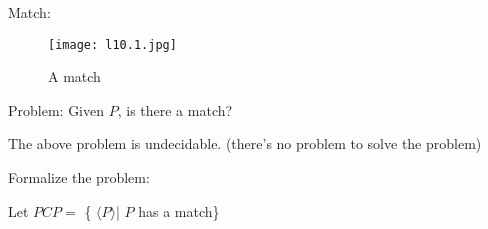 \begin{problem}
\begin{example}
        Match:
        \begin{figure}[H]
            \centering
            \texttt{[image: l10.1.jpg]}
            \caption{A match}
        \end{figure}
    \end{example}

    Problem: Given \(P\), is there a match?
\end{problem}


\begin{theorem}
    The above problem is undecidable. (there's no problem to solve the problem)

    Formalize the problem:

    Let \(PCP = \) \{ \(\langle P \rangle\)| \(P\) has a match\}
\end{theorem}
